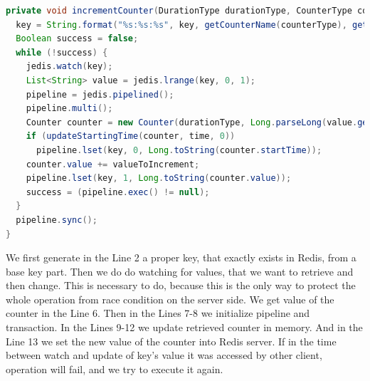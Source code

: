 \begin{lstlisting}[float=h, caption=Example of updating counter aggregation in the Redis database., label=listing:incrementCounter, language=Java]
private void incrementCounter(DurationType durationType, CounterType counterType, String key, long time, long valueToIncrement) {
  key = String.format("%s:%s:%s", key, getCounterName(counterType), getDurationName(durationType));
  Boolean success = false;
  while (!success) {
    jedis.watch(key);
    List<String> value = jedis.lrange(key, 0, 1);
    pipeline = jedis.pipelined();
    pipeline.multi();
    Counter counter = new Counter(durationType, Long.parseLong(value.get(0)), Long.parseLong(value.get(1)));
    if (updateStartingTime(counter, time, 0))
      pipeline.lset(key, 0, Long.toString(counter.startTime));
    counter.value += valueToIncrement;
    pipeline.lset(key, 1, Long.toString(counter.value));
    success = (pipeline.exec() != null);
  }
  pipeline.sync();
}
\end{lstlisting}

We first generate in the Line 2 a proper key, that exactly exists in Redis, from a base key part.
Then we do do watching for values, that we want to retrieve and then change.
This is necessary to do, because this is the only way to protect the whole operation from race condition on the server side.
We get value of the counter in the Line 6.
Then in the Lines 7-8 we initialize pipeline and transaction.
In the Lines 9-12 we update retrieved counter in memory.
And in the Line 13 we set the new value of the counter into Redis server.
If in the time between watch and update of key's value it was accessed by other client, operation will fail, and we try to execute it again.